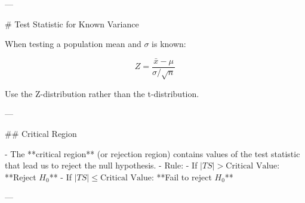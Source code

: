 ---

# Test Statistic for Known Variance

When testing a population mean and \( \sigma \) is known:

\[
Z = \frac{\bar{x} - \mu}{\sigma / \sqrt{n}}
\]

Use the Z-distribution rather than the t-distribution.

---

## Critical Region

- The **critical region** (or rejection region) contains values of the test statistic that lead us to reject the null hypothesis.
- Rule:
  - If \( |TS| > \text{Critical Value} \): **Reject \( H_0 \)**
  - If \( |TS| \leq \text{Critical Value} \): **Fail to reject \( H_0 \)**

---










